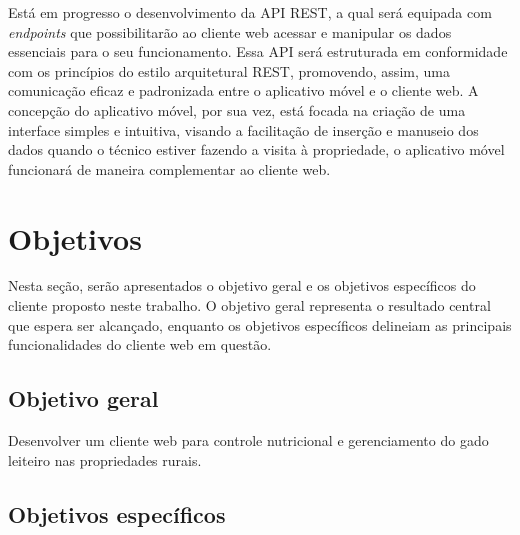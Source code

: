 Está em progresso o desenvolvimento da \gls{API} \gls{REST}, a qual será equipada com \textit{endpoints} que possibilitarão ao cliente web acessar e manipular os dados essenciais para o seu funcionamento. Essa \gls{API} será estruturada em conformidade com os princípios do estilo arquitetural \gls{REST}, promovendo, assim, uma comunicação eficaz e padronizada entre o aplicativo móvel e o cliente web. A concepção do aplicativo móvel, por sua vez, está focada na criação de uma interface simples e intuitiva, visando a facilitação de inserção e manuseio dos dados quando o técnico estiver fazendo a visita à propriedade, o aplicativo móvel funcionará de maneira complementar ao cliente web.

\section{Objetivos}\label{sec:objetivos}

Nesta seção, serão apresentados o objetivo geral e os objetivos específicos do cliente proposto neste trabalho. O objetivo geral representa o resultado central que espera ser alcançado, enquanto os objetivos específicos delineiam as principais funcionalidades do cliente web em questão.

\subsection{Objetivo geral}\label{subsec:objetivoGeral}

Desenvolver um cliente web para controle nutricional e gerenciamento do gado leiteiro nas propriedades rurais.

\subsection{Objetivos específicos}\label{subsec:objetivosEspecificos}

